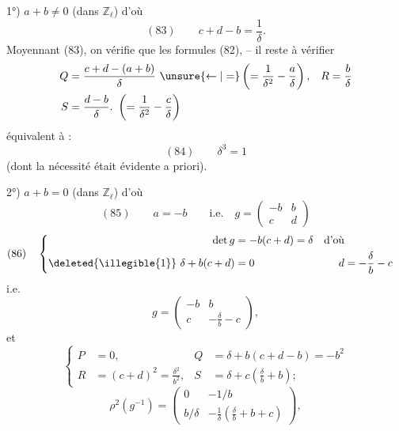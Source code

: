 


1°) $a+b\ne0$ (dans $\mathbb Z_\ell$) d'où
\[
(83)\qquad\boxed{c+d-b=\frac1\delta}.
\]
Moyennant (83), on vérifie que les formules (82), --  il reste à vérifier
\[
\begin{aligned}
Q&=\frac{c+d-(a+b)}\delta\ \unsure{\leftarrow|=}\left(=\frac1{\delta^2}-\frac a\delta\right),&R&=\frac b\delta\\
S&=\frac{d-b}\delta.\ \left(=\frac1{\delta^2}-\frac c\delta\right)
\end{aligned}
\]
équivalent à :
\[
(84)\qquad\boxed{\delta^3=1}
\]
(dont la nécessité était évidente a priori).


2°) $a+b=0$ (dans $\mathbb Z_\ell$) d'où
\[
(85)\qquad a=-b\qquad\text{i.e.}\quad g=\begin{pmatrix}-b&b\\c&d\end{pmatrix}
\]
\[
(86)\quad\left\{\begin{aligned}
\det g&=-b(c+d)=\delta&\text{d'où}\\
\deleted{\illegible{1}}\ \delta+b(c+d)&=0&d&=-\frac\delta b-c
\end{aligned}\right.
\]
i.e.
\[
g=\begin{pmatrix}-b&b\\c&-\frac\delta b-c\end{pmatrix},
\]
et
\[
\left\{\begin{aligned}
P&=0,&Q&=\delta+b(c+d-b)=-b^2\\
R&=(c+d)^2=\frac{\delta^2}{b^2},&S&=\delta+c\left(\frac\delta b+b\right);
\end{aligned}\right.
\]
\[
\rho^2(g^{-1})=\begin{pmatrix}0&-1/b\\b/\delta&-\frac1\delta\left(\frac\delta b+b+c\right)\end{pmatrix},
\]

